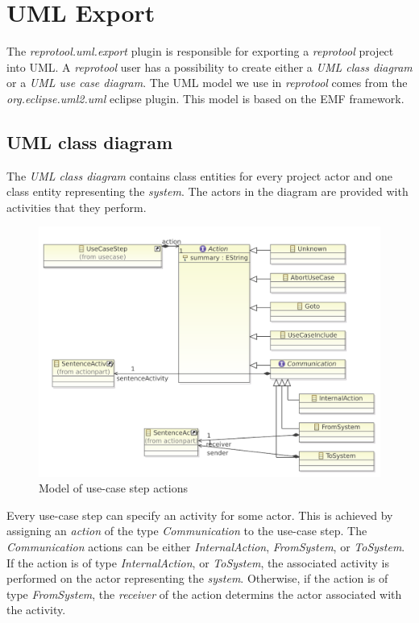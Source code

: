 \section{UML Export}

The \emph{reprotool.uml.export} plugin is responsible for exporting a \emph{reprotool} project into UML. A \emph{reprotool} user has
a possibility to create either a \emph{UML class diagram} or a \emph{UML use case diagram}. The UML model we use in \emph{reprotool}
comes from the \emph{org.eclipse.uml2.uml} eclipse plugin. This model is based on the EMF framework.

\subsection{UML class diagram}
The \emph{UML class diagram} contains class entities for every project actor and one class entity representing the \emph{system}.
The actors in the diagram are provided with activities that they perform.

\begin{figure}[ht]
  \centering
  \includegraphics[width=\textwidth]{images/ReprotoolActionsModelSimple}
  \caption{Model of use-case step actions}
  \label{fig:ReprotoolActionsModel}
\end{figure}

Every use-case step can specify an activity for some
actor. This is achieved by assigning an \emph{action} of the type \emph{Communication} to the use-case step. The \emph{Communication}
actions can be either \emph{InternalAction}, \emph{FromSystem}, or \emph{ToSystem}. If the action is of type \emph{InternalAction},
or \emph{ToSystem}, the associated activity is performed on the actor representing the \emph{system}. Otherwise, if the action is of
type \emph{FromSystem}, the \emph{receiver} of the action determins the actor associated with the activity.

